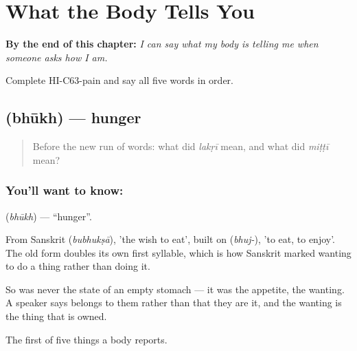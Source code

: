 
\chapter{What the Body Tells You}
\label{ch:hi-what-the-body-tells-you}

\begin{chapteropening}
\textbf{By the end of this chapter:} \emph{I can say what my body is telling me when someone asks how I am.}

Complete HI-C63-pain and say all five words in order.
\end{chapteropening}

\section[\texorpdfstring{\hi{भूख} (bhūkh)}{भूख (bhūkh)}]{ (bhūkh) — hunger}

\label{lesson:HI-C63-hunger}



\begin{quote}
Before the new run of words: what did \emph{lakṛī} mean, and what did \emph{miṭṭī} mean?
\end{quote}

\subsection*{You'll want to know: }
\textbf{} (\emph{bhūkh}) — \textquotedblleft{}hunger\textquotedblright{}.

From Sanskrit  (\emph{bubhukṣā}), 'the wish to eat', built on  (\emph{bhuj-}), 'to eat, to enjoy'. The old form doubles its own first syllable, which is how Sanskrit marked wanting to do a thing rather than doing it.

So  was never the state of an empty stomach — it was the appetite, the wanting. A speaker says  belongs to them rather than that they are it, and the wanting is the thing that is owned.

\begin{grammarlens}[title={What you've built}]
The first of five things a body reports.
\end{grammarlens}

